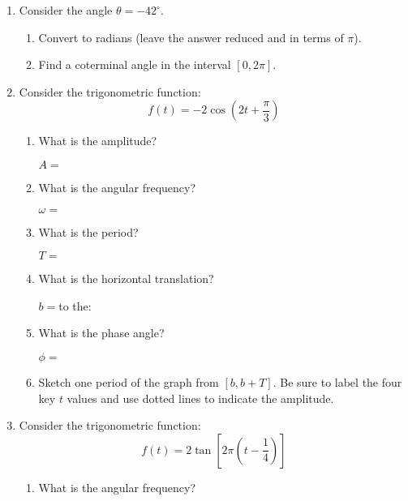 \documentclass[letterpaper,12pt,fleqn]{article}
\renewcommand{\o}{\theta}
\newcommand{\w}{\omega}
\newcommand{\p}{\phi}
\begin{document}
\begin{enumerate}

\item Consider the angle $\o=-42^{\circ}$.
  \begin{enumerate}
  \item Convert to radians (leave the answer reduced and in terms of $\pi$).

    \vspace{2in}

  \item Find a coterminal angle in the interval $[0,2\pi]$.
  \end{enumerate}

  \newpage
  
\item Consider the trigonometric function:
  \[f(t)=-2\cos\left(2t+\frac{\pi}{3}\right)\]
  \begin{enumerate}
  \item What is the amplitude?

    $A=$

  \item What is the angular frequency?

    $\w=$

  \item What is the period?

    $T=$
    
  \item What is the horizontal translation?

    $b=$\hspace{1in}to the:
    
  \item What is the phase angle?

    $\p=$

  \item Sketch one period of the graph from $[b,b+T]$. Be sure to label the
    four key $t$ values and use dotted lines to indicate the amplitude.

  \end{enumerate}

  \newpage

\item Consider the trigonometric function:
  \[f(t)=2\tan\left[2\pi\left(t-\frac{1}{4}\right)\right]\]
  \begin{enumerate}
  \item What is the angular frequency?


\end{enumerate}
\end{enumerate}
\end{document}

